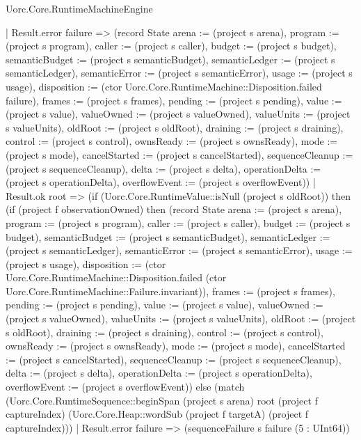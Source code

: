 \begin{lexlean}{Uorc.Core.RuntimeMachineEngine}
\begin{semanticmodule}
{        | Result.error failure => (record State {arena := (project s arena), program := (project s program), caller := (project s caller), budget := (project s budget), semanticBudget := (project s semanticBudget), semanticLedger := (project s semanticLedger), semanticError := (project s semanticError), usage := (project s usage), disposition := (ctor Uorc.Core.RuntimeMachine::Disposition.failed failure), frames := (project s frames), pending := (project s pending), value := (project s value), valueOwned := (project s valueOwned), valueUnits := (project s valueUnits), oldRoot := (project s oldRoot), draining := (project s draining), control := (project s control), ownsReady := (project s ownsReady), mode := (project s mode), cancelStarted := (project s cancelStarted), sequenceCleanup := (project s sequenceCleanup), delta := (project s delta), operationDelta := (project s operationDelta), overflowEvent := (project s overflowEvent)})
        | Result.ok root => (if (Uorc.Core.RuntimeValue::isNull (project s oldRoot)) then (if (project f observationOwned) then (record State {arena := (project s arena), program := (project s program), caller := (project s caller), budget := (project s budget), semanticBudget := (project s semanticBudget), semanticLedger := (project s semanticLedger), semanticError := (project s semanticError), usage := (project s usage), disposition := (ctor Uorc.Core.RuntimeMachine::Disposition.failed (ctor Uorc.Core.RuntimeMachine::Failure.invariant)), frames := (project s frames), pending := (project s pending), value := (project s value), valueOwned := (project s valueOwned), valueUnits := (project s valueUnits), oldRoot := (project s oldRoot), draining := (project s draining), control := (project s control), ownsReady := (project s ownsReady), mode := (project s mode), cancelStarted := (project s cancelStarted), sequenceCleanup := (project s sequenceCleanup), delta := (project s delta), operationDelta := (project s operationDelta), overflowEvent := (project s overflowEvent)}) else (match (Uorc.Core.RuntimeSequence::beginSpan (project s arena) root (project f captureIndex) (Uorc.Core.Heap::wordSub (project f targetA) (project f captureIndex)))
          | Result.error failure => (sequenceFailure s failure (5 : UInt64))
}
\end{semanticmodule}
\end{lexlean}
